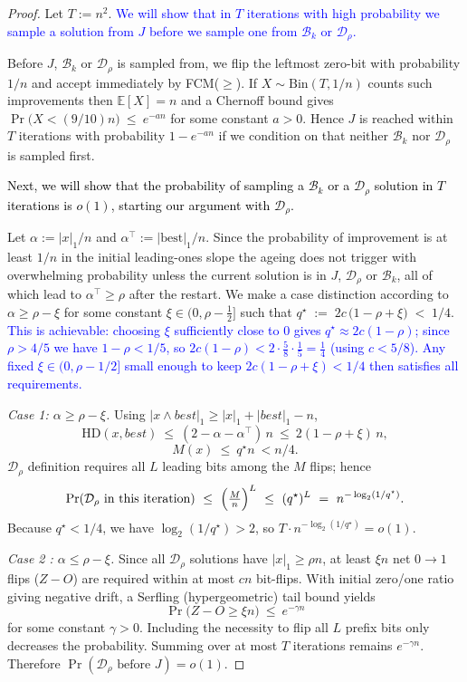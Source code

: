 \documentclass[lettersize,journal]{IEEEtran}
\begin{document}
\begin{proof}
	Let $T:=n^2$. \textcolor{blue}{We will show that in $T$ iterations with high probability we sample a solution from  $J$ before we sample one from $\mathcal{B}_k$ or $\mathcal{D}_\rho$.}

	Before $J$, $\mathcal{B}_k$ or $\mathcal{D}_\rho$ is sampled from, we flip the leftmost zero-bit with probability $1/n$ and accept
	immediately by FCM($\ge$).  If $X\sim\mathrm{Bin}(T,1/n)$ counts such improvements then
	$\mathbb{E}[X]=n$ and a Chernoff bound gives
	$
	\Pr\bigl(X<(9/10)n\bigr)\ \le\ e^{-a n}
	$
	for some constant $a>0$. Hence $J$ is reached within $T$ iterations with probability $1-e^{-a n}$ if we condition on that neither $\mathcal{B}_k$ nor $\mathcal{D}_\rho$ is sampled first.
	
	\textcolor{black}{
		Next, we will show that the probability of sampling a $\mathcal{B}_k$ or a $\mathcal{D}_\rho$ solution in $T$ iterations is $o(1)$, starting our argument with $\mathcal{D}_\rho$. 
		}
	
	Let $\alpha:=|x|_1/n$ and $\alpha^\top:=|\text{best}|_1/n$. Since the probability of improvement is at least $1/n$ in the initial leading-ones slope the ageing does not trigger with overwhelming probability unless the current solution is in $J$, $\mathcal{D}_\rho$ or $\mathcal{B}_k$, all of which lead to $\alpha^\top\ge\rho$ after the restart. We make a case distinction according to $\alpha\ge \rho-\xi$ for some constant $\xi\in(0,\rho-\tfrac12]$  such that	$q^\star \;:=\; 2c\,\bigl(1-\rho+\xi\bigr) \;<\; 1/4$.
\textcolor{blue}{This is achievable: choosing $\xi$ sufficiently close to $0$ gives
$q^\star \approx 2c(1-\rho)$; since $\rho > 4/5$ we have $1-\rho < 1/5$,
so $2c(1-\rho) < 2 \cdot \tfrac{5}{8} \cdot \tfrac{1}{5} = \tfrac{1}{4}$
(using $c < 5/8$).  Any fixed $\xi \in (0, \rho - 1/2]$ small enough to
keep $2c(1-\rho+\xi) < 1/4$ then satisfies all requirements.}
	
	\emph{Case 1: $\alpha\ge \rho-\xi$.}
	Using $|x\wedge best|_1\ge |x|_1+|best|_1-n$,
	\[
	\mathrm{HD}(x,best)\ \le\ (2-\alpha-\alpha^\top)\,n\ \le\ 2(1-\rho+\xi)\,n,
	\]
	\[
	M(x)\ \le\ q^\star n\ <n/4
	.
	\]
	$\mathcal{D}_\rho$ definition requires all $L$ leading bits among the $M$ flips; hence
	\[
	\Pr(\text{$\mathcal{D}_\rho$ in this iteration})
	\ \le\
	\Bigl(\tfrac{M}{n}\Bigr)^{L}
	\ \le\
	(q^\star)^{L}
	\ =\
	n^{-\log_{2}(1/q^\star)}.
	\]
	Because $q^\star<1/4$, we have $\log_{2}(1/q^\star)>2$, so $T\cdot n^{-\log_{2}(1/q^\star)}=o(1)$.
	
	\emph{Case 2 : $\alpha\le \rho-\xi$.}
	Since all $\mathcal{D}_\rho$ solutions have $|x|_1\ge \rho n$, at least $\xi n$ net $0\!\to\!1$ flips ($Z-O$) are required within at most
	$cn$ bit-flips. With initial zero/one ratio giving negative drift,
	a Serfling (hypergeometric) tail bound yields
	\[
	\Pr\bigl(Z-O\ge \xi n\bigr)\ \le\ e^{-\gamma n}
	\]
	for some constant $\gamma>0$. Including the necessity to flip all $L$ prefix bits only decreases the probability.
	Summing over at most $T$ iterations remains $e^{-\gamma n}$. Therefore $\Pr(\text{$\mathcal{D}_\rho$ before }J)=o(1)$.
	

\end{proof}
\end{document}
